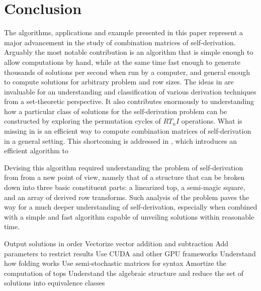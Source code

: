 \section{Conclusion}

The algorithms, applications and example presented in this paper represent a major advancement in the study of combination matrices of self-derivation. Arguably the most notable contribution is an algorithm that is simple enough to allow computations by hand, while at the same time fast enough to generate thousands of solutions per second when run by a computer, and general enough to compute solutions for arbitrary problem and row sizes. The ideas in \cite{Starr1984} are invaluable for an understanding and classification of various derivation techniques from a set-theoretic perspective. It also contributes enormously to understanding how a particular class of solutions for the self-derivation problem can be constructed by exploring the permutation cycles of $RT_nI$ operations. What is missing in \cite{Starr1984} is an efficient way to compute combination matrices of self-derivation in a general setting. This shortcoming is addressed in \cite{Kowalski1987b}, which introduces an efficient algorithm to 


Devising this algorithm required understanding the problem of self-derivation from from a new point of view, namely that of a structure that can be broken down into three basic constituent parts: a linearized top, a semi-magic square, and an array of derived row transforms. Such analysis of the problem paves the way for a much deeper understanding of self-derivation, especially when combined with a simple and fast algorithm capable of unveiling solutions within reasonable time.

Output solutions in order
Vectorize vector addition and subtraction
Add parameters to restrict results
Use CUDA and other GPU frameworks
Understand how folding works
Use semi-stochastic matrices for syntax
Amortize the computation of tops
Understand the algebraic structure and reduce the set of solutions into equivalence classes
